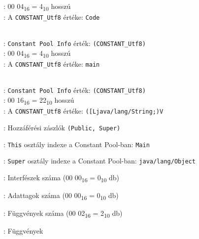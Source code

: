 \begin{compactitem}
\begin{compactitem}
    : 00 04\textsubscript{16} = 4\textsubscript{10} hosszú \\
    : A \lstinline{CONSTANT_Utf8} értéke: \lstinline{Code}
	\item {}   \\
	: \lstinline{Constant Pool Info} érték: \lstinline{(CONSTANT_Utf8)} \\
    : 00 04\textsubscript{16} = 4\textsubscript{10} hosszú \\
    : A \lstinline{CONSTANT_Utf8} értéke: \lstinline{main}
	\item {}   \\
	: \lstinline{Constant Pool Info} érték: \lstinline{(CONSTANT_Utf8)} \\
    : 00 16\textsubscript{16} = 22\textsubscript{10} hosszú \\
    : A \lstinline{CONSTANT_Utf8} értéke: \lstinline{([Ljava/lang/String;)V}
\end{compactitem}
\item {}: Hozzáférési zászlók \lstinline{(Public, Super)}
\item {}: \lstinline{This} osztály indexe a Constant Pool-ban: \lstinline{Main}
\item {}: \lstinline{Super} osztály indexe a Constant Pool-ban: \lstinline{java/lang/Object}
\item {}: Interfészek száma (00 00\textsubscript{16} = 0\textsubscript{10} db)
\item {}: Adattagok száma (00 00\textsubscript{16} = 0\textsubscript{10} db)
\item {}: Függvények száma (00 02\textsubscript{16} = 2\textsubscript{10} db)
\item {}: Függvények
\begin{compactitem}
    \setlength\itemsep{-5px}
    \item {}     \\

\end{compactitem}
\end{compactitem}
